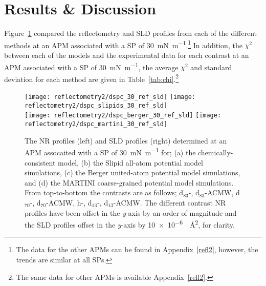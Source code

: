 \section{Results \& Discussion}
Figure~\ref{fig:dspcccref30} compared the reflectometry and SLD profiles from each of the different methods at an APM associated with a SP of \SI{30}{\milli\newton\per\meter}.\footnote{The data for the other APMs can be found in Appendix~\ref{refl2}, however, the trends are similar at all SPs.}
In addition, the $\chi^2$ between each of the models and the experimental data for each contrast at an APM associated with a SP of \SI{30}{\milli\newton\per\meter}, the average $\chi^2$ and standard deviation for each method are given in Table~\ref{tab:chi}.\footnote{The same data for other APMs is available Appendix~\ref{refl2}.}
%
\begin{figure}[t]
    \centering
    \texttt{[image: reflectometry2/dspc\_30\_ref\_sld]}
    \texttt{[image: reflectometry2/dspc\_slipids\_30\_ref\_sld]}\\
    \texttt{[image: reflectometry2/dspc\_berger\_30\_ref\_sld]}
    \texttt{[image: reflectometry2/dspc\_martini\_30\_ref\_sld]}
    \caption{The NR profiles (left) and SLD profiles (right) determined at an APM assocaited with a SP of \SI{30}{\milli\newton\per\meter} for; (a) the chemically-consistent model, (b) the Slipid all-atom potential model simulations, (c) the Berger united-atom potential model simulations, and (d) the MARTINI coarse-grained potential model simulations. From top-to-bottom the contrasts are as follows; d$_{83}$-, d$_{83}$-ACMW, d$_{70}$-, d$_{70}$-ACMW, h-, d$_{13}$-, d$_{13}$-ACMW. The different contrast NR profiles have been offset in the \emph{y}-axis by an order of magnitude and the SLD profiles offset in the \emph{y}-axis by \SI{10e-6}{\per\angstrom\squared}, for clarity.}
    \label{fig:dspcccref30}
\end{figure}
%
%
